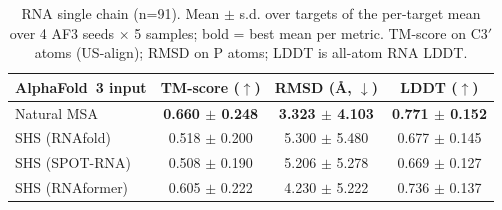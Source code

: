 \begin{table}[htbp]
\centering
\caption{RNA single chain (n=91). Mean $\pm$ s.d. over targets of the per-target mean over 4 AF3 seeds $\times$ 5 samples; bold = best mean per metric. TM-score on C3$'$ atoms (US-align); RMSD on P atoms; LDDT is all-atom RNA LDDT.}
\label{tab:rna_single_chain}
\begin{tabular}{lccc}
\toprule
AlphaFold~3 input & TM-score ($\uparrow$) & RMSD (\AA, $\downarrow$) & LDDT ($\uparrow$) \\
\midrule
Natural MSA & \textbf{0.660 $\pm$ 0.248} & \textbf{3.323 $\pm$ 4.103} & \textbf{0.771 $\pm$ 0.152} \\
SHS (RNAfold) & 0.518 $\pm$ 0.200 & 5.300 $\pm$ 5.480 & 0.677 $\pm$ 0.145 \\
SHS (SPOT-RNA) & 0.508 $\pm$ 0.190 & 5.206 $\pm$ 5.278 & 0.669 $\pm$ 0.127 \\
SHS (RNAformer) & 0.605 $\pm$ 0.222 & 4.230 $\pm$ 5.222 & 0.736 $\pm$ 0.137 \\
\bottomrule
\end{tabular}
\end{table}
